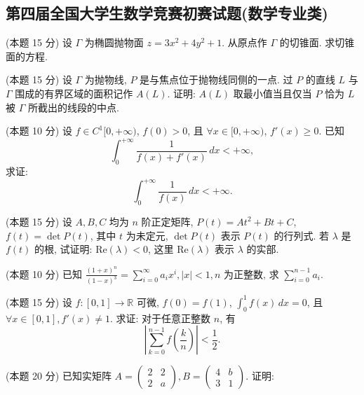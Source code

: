 \documentclass[loose]{ExBook}
\begin{document}
\subsection{第四届全国大学生数学竞赛初赛试题(数学专业类)}
\begin{qitems}
    \begin{bbox}
        \qitem (本题 15 分) 设 \(\Gamma\) 为椭圆抛物面 \(z = 3x^2 + 4y^2 + 1\). 从原点作 \(\Gamma\) 的切锥面. 求切锥面的方程.
    \end{bbox}

    \begin{bbox}
        \qitem (本题 15 分) 设 \(\Gamma\) 为抛物线, \(P\) 是与焦点位于抛物线同侧的一点. 过 \(P\) 的直线 \(L\) 与 \(\Gamma\) 围成的有界区域的面积记作 \(A(L)\). 证明: \(A(L)\) 取最小值当且仅当 \(P\) 恰为 \(L\) 被 \(\Gamma\) 所截出的线段的中点.
    \end{bbox}

    \begin{bbox}
        \qitem (本题 10 分) 设 \(f \in C^1[0,+\infty)\), \(f(0)>0\), 且 \(\forall x \in [0,+\infty)\), \(f'(x) \geq 0\). 已知
        \[\int_0^{+\infty} \frac{1}{f(x)+f'(x)} \, dx < +\infty,\]
        求证:
        \[\int_0^{+\infty} \frac{1}{f(x)} \, dx < +\infty.\]
    \end{bbox}

    \begin{bbox}
        \qitem (本题 15 分) 设 \(A,B,C\) 均为 \(n\) 阶正定矩阵, \(P(t) = At^2 + Bt + C\), \(f(t) = \det P(t)\), 其中 \(t\) 为未定元, \(\det P(t)\) 表示 \(P(t)\) 的行列式. 若 \(\lambda\) 是 \(f(t)\) 的根, 试证明: \(\mathrm{Re}(\lambda)<0\), 这里 \(\mathrm{Re}(\lambda)\) 表示 \(\lambda\) 的实部.
    \end{bbox}

    \begin{bbox}
        \qitem (本题 10 分) 已知
        \(\frac{(1+x)^n}{(1-x)^3} = \sum_{i=0}^{\infty} a_i x^i, |x|<1, n \text{ 为正整数, 求 } \sum_{i=0}^{n-1} a_i.\)
    \end{bbox}

    \begin{bbox}
        \qitem (本题 15 分) 设 \(f:[0,1] \rightarrow \mathbb{R}\) 可微, \(f(0)=f(1)\), \(\int_0^1 f(x) \, dx = 0\), 且 \(\forall x \in [0,1], f'(x) \neq 1\). 求证: 对于任意正整数 \(n\), 有
        \[\left| \sum_{k=0}^{n-1} f\left(\frac{k}{n}\right) \right| < \frac{1}{2}.\]
    \end{bbox}

    \begin{bbox}
        \qitem (本题 20 分) 已知实矩阵 \(A = 
        \begin{pmatrix}
        2 & 2 \\
        2 & a
        \end{pmatrix}, B = 
        \begin{pmatrix}
        4 & b \\
        3 & 1
        \end{pmatrix}\). 证明:


\end{bbox}
\end{qitems}
\end{document}
